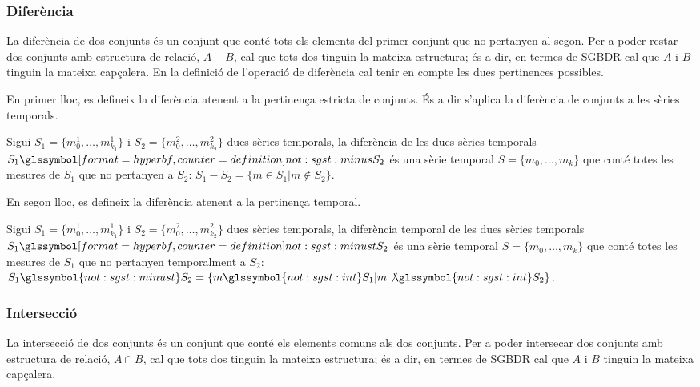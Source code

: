 \subsubsection{Diferència}

La diferència de dos conjunts és un conjunt que conté tots els
elements del primer conjunt que no pertanyen al segon.  Per a poder
restar dos conjunts amb estructura de relació, $A - B$, cal que tots
dos tinguin la mateixa estructura; és a dir, en termes de \gls{SGBDR}
cal que $A$ i $B$ tinguin la mateixa capçalera.
En la definició de l'operació de diferència cal tenir en compte les
dues pertinences possibles.

En primer lloc, es defineix la diferència atenent a la pertinença
estricta de conjunts. És a dir s'aplica la diferència de
conjunts a les sèries temporals.
\begin{definition}[diferència]
  Sigui $S_1=\{m_0^1, \dotsc, m_{k_1}^1\}$ i $S_2=\{m_0^2, \dotsc,
  m_{k_2}^2\}$ dues sèries temporals, la diferència de les dues sèries
  temporals $S_1 \glssymboldef{not:sgst:minus} S_2$ és una sèrie
  temporal $S=\{m_0, \dotsc, m_k\}$ que conté totes les mesures de
  $S_1$ que no pertanyen a $S_2$: $S_1 - S_2 = \{ m \in S_1 | m \notin
  S_2 \}$.
\end{definition}

En segon lloc, es defineix la diferència atenent a la pertinença
temporal.
\begin{definition}
  Sigui $S_1=\{m_0^1, \dotsc, m_{k_1}^1\}$ i $S_2=\{m_0^2, \dotsc,
  m_{k_2}^2\}$ dues sèries temporals, la diferència temporal de les
  dues sèries temporals $S_1 \glssymboldef{not:sgst:minust} S_2$ és
  una sèrie temporal $S=\{m_0, \dotsc, m_k\}$ que conté totes les
  mesures de $S_1$ que no pertanyen temporalment a $S_2$: $S_1
  \glssymbol{not:sgst:minust} S_2 = \{ m \glssymbol{not:sgst:int} S_1 | m
  \not\glssymbol{not:sgst:int} S_2 \}$.
\end{definition}




\subsubsection{Intersecció}

La intersecció de dos conjunts és un conjunt que conté els elements
comuns als dos conjunts.  Per a poder intersecar dos conjunts amb estructura
de relació, $A \cap B$, cal que tots dos tinguin la mateixa
estructura; és a dir, en termes de \gls{SGBDR} cal que $A$ i $B$ tinguin la
mateixa capçalera.

